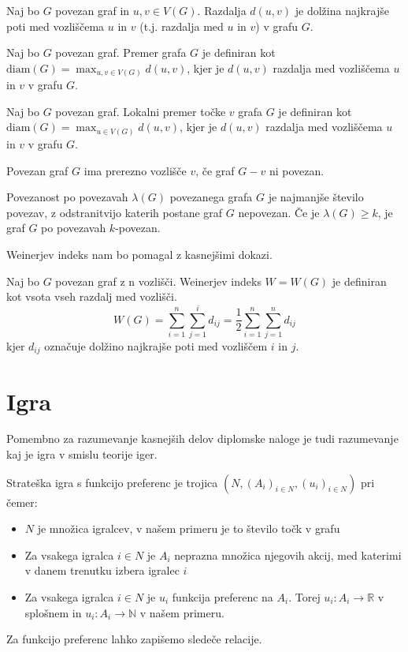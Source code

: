 \documentclass[fin1, tisk]{fmfdelo}
\begin{document}
\begin{definicija}
Naj bo $G$ povezan graf in $u, v \in V(G)$. Razdalja $d(u, v)$ je dolžina najkrajše poti med vozliščema $u$ in $v$ (t.j. razdalja med $u$ in $v$) v grafu $G$.
\end{definicija}

\begin{definicija}
Naj bo $G$ povezan graf. Premer grafa $G$ je definiran kot $\text{diam}(G) = \max_{u, v \in V(G)} d(u, v)$, kjer je $d(u, v)$ razdalja med vozliščema $u$ in $v$ v grafu $G$.
\end{definicija}

\begin{definicija}
Naj bo $G$ povezan graf. Lokalni premer točke $v$ grafa $G$ je definiran kot $\text{diam}(G) = \max_{u \in V(G)} d(u, v)$, kjer je $d(u, v)$ razdalja med vozliščema $u$ in $v$ v grafu $G$.
\end{definicija}

\begin{definicija}
Povezan graf $G$ ima prerezno vozlišče $v$, če graf $G - v$ ni povezan.
\end{definicija}

\begin{definicija}
Povezanost po povezavah $\lambda(G)$ povezanega grafa $G$ je najmanjše število povezav,
z odstranitvijo katerih postane graf $G$ nepovezan. Če je $\lambda(G) \geq k$,
je graf $G$ po povezavah $k$-povezan.
\end{definicija}

Weinerjev indeks nam bo pomagal z kasnejšimi dokazi.

\begin{definicija}
Naj bo $G$ povezan graf z n vozlišči. Weinerjev indeks $W = W(G)$ je definiran
kot vsota vseh razdalj med vozlišči.
$$W(G) = \sum_{i=1}^{n} \sum_{j=1}^{i} d_{ij} = \frac{1}{2} \sum_{i=1}^{n} \sum_{j=1}^{n} d_{ij}$$
kjer $d_{ij}$ označuje dolžino najkrajše poti med vozliščem $i$ in $j$.
\end{definicija}

\section{Igra}
Pomembno za razumevanje kasnejših delov diplomske naloge je tudi razumevanje kaj je igra v smislu teorije iger.

\begin{definicija}
    Strateška igra s funkcijo preferenc je trojica $(N, (A_i)_{i\in N} , (u_i)_{i\in N})$ pri čemer:
\begin{itemize}
    \item $N$ je množica igralcev, v našem primeru je to število točk v grafu
    \item Za vsakega igralca $i \in N$ je $A_i$ neprazna množica njegovih akcij, med katerimi v danem trenutku izbera igralec $i$
    \item Za vsakega igralca $i \in N$ je $u_i$ funkcija preferenc na $A_i$. Torej $u_i : A_i \to \mathbb{R}$ v splošnem in $u_i : A_i \to \mathbb{N}$ v našem primeru.
\end{itemize}
\end{definicija}
Za funkcijo preferenc lahko zapišemo sledeče relacije.
\end{document}
